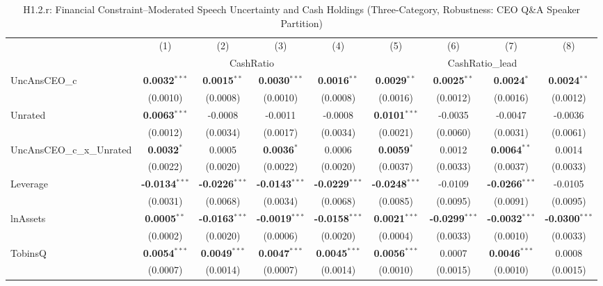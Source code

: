 \documentclass[11pt,a4paper]{article}
\begin{document}
\begin{table}[htbp]
\centering
\caption{H1.2.r: Financial Constraint--Moderated Speech Uncertainty and Cash Holdings (Three-Category, Robustness: CEO Q\&A Speaker Partition)}
\label{tab:h1_2_robust}
\scriptsize
\begin{tabular}{lcccccccc}
\toprule
 & (1) & (2) & (3) & (4) & (5) & (6) & (7) & (8) \\
 & \multicolumn{4}{c}{CashRatio} & \multicolumn{4}{c}{CashRatio\_lead} \\
\cmidrule(lr){2-5} \cmidrule(lr){6-9}
\midrule
UncAnsCEO\_c & \textbf{0.0032}$^{***}$ & \textbf{0.0015}$^{**}$ & \textbf{0.0030}$^{***}$ & \textbf{0.0016}$^{**}$ & \textbf{0.0029}$^{**}$ & \textbf{0.0025}$^{**}$ & \textbf{0.0024}$^{*}$ & \textbf{0.0024}$^{**}$ \\
 & (0.0010) & (0.0008) & (0.0010) & (0.0008) & (0.0016) & (0.0012) & (0.0016) & (0.0012) \\
Unrated & \textbf{0.0063}$^{***}$ & -0.0008 & -0.0011 & -0.0008 & \textbf{0.0101}$^{***}$ & -0.0035 & -0.0047 & -0.0036 \\
 & (0.0012) & (0.0034) & (0.0017) & (0.0034) & (0.0021) & (0.0060) & (0.0031) & (0.0061) \\
UncAnsCEO\_c\_x\_Unrated & \textbf{0.0032}$^{*}$ & 0.0005 & \textbf{0.0036}$^{*}$ & 0.0006 & \textbf{0.0059}$^{*}$ & 0.0012 & \textbf{0.0064}$^{**}$ & 0.0014 \\
 & (0.0022) & (0.0020) & (0.0022) & (0.0020) & (0.0037) & (0.0033) & (0.0037) & (0.0033) \\
\midrule
Leverage & \textbf{-0.0134}$^{***}$ & \textbf{-0.0226}$^{***}$ & \textbf{-0.0143}$^{***}$ & \textbf{-0.0229}$^{***}$ & \textbf{-0.0248}$^{***}$ & -0.0109 & \textbf{-0.0266}$^{***}$ & -0.0105 \\
 & (0.0031) & (0.0068) & (0.0034) & (0.0068) & (0.0085) & (0.0095) & (0.0091) & (0.0095) \\
lnAssets & \textbf{0.0005}$^{**}$ & \textbf{-0.0163}$^{***}$ & \textbf{-0.0019}$^{***}$ & \textbf{-0.0158}$^{***}$ & \textbf{0.0021}$^{***}$ & \textbf{-0.0299}$^{***}$ & \textbf{-0.0032}$^{***}$ & \textbf{-0.0300}$^{***}$ \\
 & (0.0002) & (0.0020) & (0.0006) & (0.0020) & (0.0004) & (0.0033) & (0.0010) & (0.0033) \\
TobinsQ & \textbf{0.0054}$^{***}$ & \textbf{0.0049}$^{***}$ & \textbf{0.0047}$^{***}$ & \textbf{0.0045}$^{***}$ & \textbf{0.0056}$^{***}$ & 0.0007 & \textbf{0.0046}$^{***}$ & 0.0008 \\
 & (0.0007) & (0.0014) & (0.0007) & (0.0014) & (0.0010) & (0.0015) & (0.0010) & (0.0015) \\

\end{tabular}
\end{table}
\end{document}

